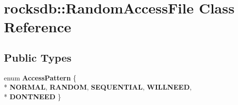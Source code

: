 \hypertarget{classrocksdb_1_1RandomAccessFile}{}\section{rocksdb\+:\+:Random\+Access\+File Class Reference}
\label{classrocksdb_1_1RandomAccessFile}
\subsection*{Public Types}
\begin{DoxyCompactItemize}
\item 
enum {\bfseries Access\+Pattern} \{ \\*
{\bfseries N\+O\+R\+M\+AL}, 
{\bfseries R\+A\+N\+D\+OM}, 
{\bfseries S\+E\+Q\+U\+E\+N\+T\+I\+AL}, 
{\bfseries W\+I\+L\+L\+N\+E\+ED}, 
\\*
{\bfseries D\+O\+N\+T\+N\+E\+ED}
 \}\hypertarget{classrocksdb_1_1RandomAccessFile_a6bf9074480c2cf24836631271a988547}{}\label{classrocksdb_1_1RandomAccessFile_a6bf9074480c2cf24836631271a988547}

\end{DoxyCompactItemize}
